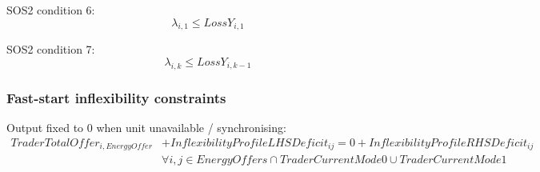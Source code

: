 \documentclass{article}
\begin{document}
SOS2 condition 6:
\begin{equation}
	\lambda_{i,1} \leq LossY_{i,1}
\end{equation}

SOS2 condition 7:
\begin{equation}
\lambda_{i,k} \leq LossY_{i,k-1}
\end{equation}

\subsubsection{Fast-start inflexibility constraints}
%
%
%
%
%
%

Output fixed to 0 when unit unavailable / synchronising:
\begin{equation}
\begin{split}
TraderTotalOffer_{i,EnergyOffer} & + InflexibilityProfileLHSDeficit_{ij} = 0 + InflexibilityProfileRHSDeficit_{ij} \\
& \forall i,j \in EnergyOffers \cap TraderCurrentMode0 \cup TraderCurrentMode1
\end{split}
\end{equation}
\end{document}

